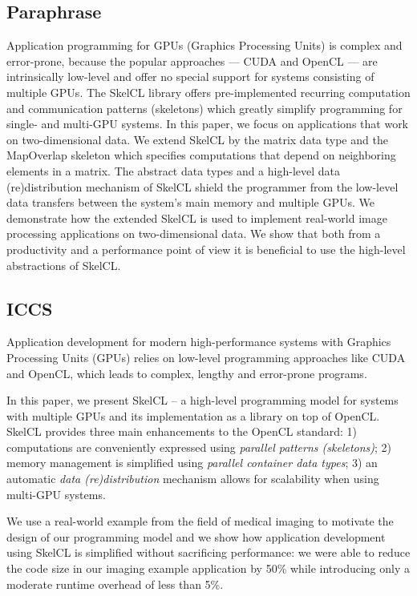 \subsection{Paraphrase}
Application programming for GPUs (Graphics Processing Units) is complex and error-prone, because the popular approaches --- CUDA and OpenCL --- are intrinsically low-level and offer no special support for systems consisting of multiple GPUs.
The SkelCL library offers pre-implemented recurring computation and communication patterns (skeletons) which greatly simplify programming for single- and multi-GPU systems.
In this paper, we focus on applications that work on two-dimensional data.
We extend SkelCL by the matrix data type and the MapOverlap skeleton which specifies computations that depend on neighboring elements in a matrix.
The abstract data types and a high-level data (re)distribution mechanism of SkelCL shield the programmer from the low-level data transfers between the system's main memory and multiple GPUs.
We demonstrate how the extended SkelCL is used to implement real-world image processing applications on two-dimensional data.
We show that both from a productivity and a performance point of view it is beneficial to use the high-level abstractions of SkelCL.


\subsection{ICCS}
Application development for modern high-performance systems with Graphics Processing Units (GPUs) relies on low-level programming approaches like CUDA and OpenCL, which leads to complex, lengthy and error-prone programs.

In this paper, we present SkelCL -- a high-level programming model for systems with multiple GPUs and its implementation as a library on top of OpenCL.
SkelCL provides three main enhancements to the OpenCL standard:
1) computations are conveniently expressed using \emph{parallel patterns (skeletons)};
2) memory management is simplified using \emph{parallel container data types};
3) an automatic \emph{data (re)distribution} mechanism allows for scalability when using multi-GPU systems.

We use a real-world example from the field of medical imaging to motivate the design of our programming model and we show how application development using SkelCL is simplified without sacrificing performance:
we were able to reduce the code size in our imaging example application by 50\% while introducing only a moderate runtime overhead of less than 5\%.


